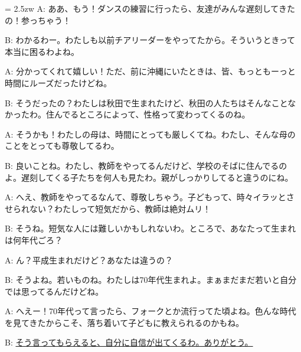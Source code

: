 \documentclass[11pt]{amsart}
\title{}
\author{}
\newenvironment{hangall}[1]{\hangindent = 2.5zw\everypar{\hangindent = 2.5zw}}{}
\begin{document}
\maketitle
\begin{hangall}{}%
A: ああ、もう！ダンスの練習に行ったら、友達がみんな遅刻してきたの！参っちゃう！

B: わかるわー。わたしも以前チアリーダーをやってたから。そういうときって本当に困るわよね。

A: 分かってくれて嬉しい！ただ、前に沖縄にいたときは、皆、もっともーっと時間にルーズだったけどね。

B: そうだったの？わたしは秋田で生まれたけど、秋田の人たちはそんなことなかったわ。住んでるところによって、性格って変わってくるのね。

A: そうかも！わたしの母は、時間にとっても厳しくてね。わたし、そんな母のことをとっても尊敬してるわ。

B: 良いことね。わたし、教師をやってるんだけど、学校のそばに住んでるのよ。遅刻してくる子たちを何人も見たわ。親がしっかりしてると違うのにね。

A: へえ、教師をやってるなんて、尊敬しちゃう。子どもって、時々イラッとさせられない？わたしって短気だから、教師は絶対ムリ！

B: そうね。短気な人には難しいかもしれないわ。ところで、あなたって生まれは何年代ごろ？

A: ん？平成生まれだけど？あなたは違うの？

B: そうよね。若いものね。わたしは70年代生まれよ。まぁまだまだ若いと自分では思ってるんだけどね。

A: へえー！70年代って言ったら、フォークとか流行ってた頃よね。色んな時代を見てきたからこそ、落ち着いて子どもに教えられるのかもね。

B: \ul{そう言ってもらえると、自分に自信が出てくるわ。ありがとう。}\end{hangall}
\end{document}
